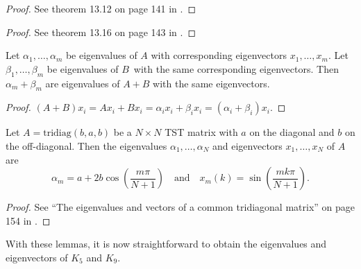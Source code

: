 \begin{lemma}\label{pde:lemma:eigkronprod}
\kroeneckerlemmatext{\otimes}{\,}
\end{lemma}
\begin{proof}
See theorem 13.12 on page 141 in \cite{Laub_2004}.
\end{proof}
\begin{lemma}\label{pde:lemma:eigkronsum}
\kroeneckerlemmatext{\oplus}{+}
\end{lemma}
\begin{proof}
See theorem 13.16 on page 143 in \cite{Laub_2004}.
\end{proof}
\begin{lemma}\label{pde:lemma:eigsum}
Let $\alpha_1, \dots, \alpha_m$ be eigenvalues of $A$ with corresponding eigenvectors $x_1, \dots, x_m$.
Let $\beta_1, \dots, \beta_m$ be eigenvalues of $B$ with the same corresponding eigenvectors.
Then $\alpha_m + \beta_m$ are eigenvalues of $A+B$ with the same eigenvectors.
\end{lemma}
\begin{proof}
$ (A + B) x_i = A x_i + B x_i = \alpha_i x_i + \beta_i x_i = (\alpha_i + \beta_i) x_i.$
\end{proof}
\begin{lemma}\label{pde:lemma:eigtst}
Let $A = \text{tridiag}(b,a,b)$ be a $N \times N$ TST matrix with $a$ on the diagonal and $b$ on the off-diagonal.
Then the eigenvalues $\alpha_1, \dots, \alpha_N$ and eigenvectors $x_1, \dots, x_N$ of $A$ are
\begin{equation}
\alpha_m = a + 2b \cos \left( \frac{m\pi}{N+1} \right)
\quad \text{and} \quad
x_m(k) = \sin \left( \frac{mk\pi}{N+1} \right).
\label{eq:pde:eigtst}
\end{equation}
\end{lemma}
\begin{proof}
See ``The eigenvalues and vectors of a common tridiagonal matrix'' on page 154 in \cite{Smith}.
\end{proof}

With these lemmas, it is now straightforward to obtain the eigenvalues and eigenvectors of $K_5$ and $K_9$.

